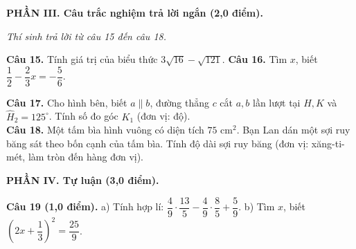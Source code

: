 \documentclass[10.5pt,a4paper]{article}
\begin{document}
\vspace{1.5mm}
\noindent\textbf{\large PHẦN III. Câu trắc nghiệm trả lời ngắn (2,0 điểm).}
\vspace{0.5mm}

\noindent\textit{Thí sinh trả lời từ câu 15 đến câu 18.}

\vspace{1mm}
\noindent\textbf{Câu 15.} Tính giá trị của biểu thức $3\sqrt{16} - \sqrt{121}$.\hfill
\textbf{Câu 16.} Tìm $x$, biết $\dfrac{1}{2} - \dfrac{2}{3}x = -\dfrac{5}{6}$.

\vspace{1mm}
\noindent
\begin{minipage}[m]{0.65\linewidth}
\textbf{Câu 17.} Cho hình bên, biết $a \parallel b$, đường thẳng $c$ cắt $a, b$ lần lượt tại $H, K$ và $\widehat{H}_2 = 125^\circ$. Tính số đo góc $K_1$ (đơn vị: độ).\\
\textbf{Câu 18.} Một tấm bìa hình vuông có diện tích $75\text{ cm}^2$. Bạn Lan dán một sợi ruy băng sát theo bốn cạnh của tấm bìa. Tính độ dài sợi ruy băng (đơn vị: xăng-ti-mét, làm tròn đến hàng đơn vị).
\end{minipage}
\hfill
\begin{minipage}[m]{0.33\linewidth}
\centering
{}
\end{minipage}

\vspace{1.5mm}
\noindent\textbf{\large PHẦN IV. Tự luận (3,0 điểm).}
\vspace{1mm}

\noindent\textbf{Câu 19 (1,0 điểm).} a) Tính hợp lí: $\dfrac{4}{9} \cdot \dfrac{13}{5} - \dfrac{4}{9} \cdot \dfrac{8}{5} + \dfrac{5}{9}$. \quad b) Tìm $x$, biết $\left(2x + \dfrac{1}{3}\right)^2 = \dfrac{25}{9}$.
\end{document}
